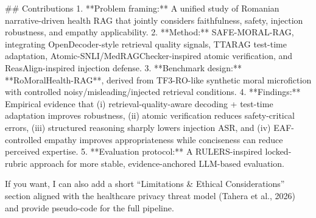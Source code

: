 ## Contributions
1. **Problem framing:** A unified study of Romanian narrative-driven health RAG that jointly considers faithfulness, safety, injection robustness, and empathy applicability.
2. **Method:** SAFE-MORAL-RAG, integrating OpenDecoder-style retrieval quality signals, TTARAG test-time adaptation, Atomic-SNLI/MedRAGChecker-inspired atomic verification, and ReasAlign-inspired injection defense.
3. **Benchmark design:** **RoMoralHealth-RAG**, derived from TF3-RO-like synthetic moral microfiction with controlled noisy/misleading/injected retrieval conditions.
4. **Findings:** Empirical evidence that (i) retrieval-quality-aware decoding + test-time adaptation improves robustness, (ii) atomic verification reduces safety-critical errors, (iii) structured reasoning sharply lowers injection ASR, and (iv) EAF-controlled empathy improves appropriateness while conciseness can reduce perceived expertise.
5. **Evaluation protocol:** A RULERS-inspired locked-rubric approach for more stable, evidence-anchored LLM-based evaluation.

If you want, I can also add a short “Limitations & Ethical Considerations” section aligned with the healthcare privacy threat model (Tahera et al., 2026) and provide pseudo-code for the full pipeline.